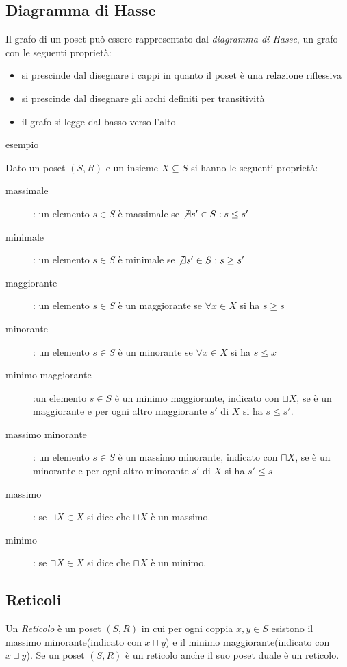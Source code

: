 \subsection{Diagramma di Hasse}
Il grafo di un poset può essere rappresentato dal \emph{diagramma di Hasse}, un grafo
con le seguenti proprietà:
\begin{itemize}
    \item si prescinde dal disegnare i cappi in quanto il poset è una relazione riflessiva
    \item si prescinde dal disegnare gli archi definiti per transitività
    \item il grafo si legge dal basso verso l'alto
\end{itemize}

esempio

\begin{prop}
Dato un poset $(S,R)$ e un insieme $X \subseteq S$ si hanno le seguenti proprietà:
\begin{description}
    \item[massimale]: un elemento $s \in S$ è massimale se $\not \exists s' \in S : s \leq s'$
    \item[minimale]: un elemento $s \in S$ è minimale se $\not \exists s' \in S : s \geq s'$
    \item[maggiorante]: un elemento $s \in S$ è un maggiorante se $\forall x \in X$ si ha $s \geq s$
    \item[minorante]: un elemento $s \in S$ è un minorante se $\forall x \in X$ si ha $s \leq x$
    \item[minimo maggiorante]:un elemento $s \in S$ è un minimo maggiorante, indicato con $\sqcup X$,
          se è un maggiorante e per ogni altro maggiorante $s'$ di $X$ si ha $s \leq s'$.
    \item[massimo minorante]: un elemento $s \in S$ è un massimo minorante, indicato con $\sqcap X$,
          se è un minorante e per ogni altro minorante $s'$ di $X$ si ha $s' \leq s$
    \item[massimo]: se $\sqcup X \in X$ si dice che $\sqcup X$ è un massimo.
    \item[minimo]: se $\sqcap X \in X$ si dice che $\sqcap X$ è un minimo.
\end{description}
\end{prop}


\subsection{Reticoli}
Un \emph{Reticolo} è un poset $(S,R)$ in cui per ogni coppia $x,y \in S$ esistono
il massimo minorante(indicato con $x \sqcap y$) e il minimo maggiorante(indicato con $x \sqcup y$).
Se un poset $(S,R)$ è un reticolo anche il suo poset duale è un reticolo.
